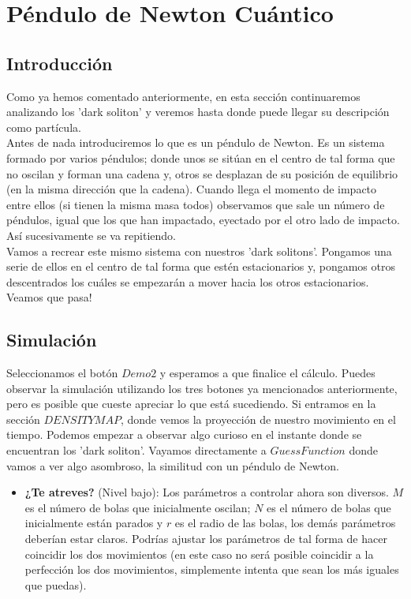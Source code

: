 \section{P\'endulo de Newton Cu\'antico}

\subsection{Introducci\'on}
Como ya hemos comentado anteriormente, en esta secci\'on continuaremos analizando los 'dark soliton' y veremos hasta donde puede llegar su descripci\'on como part\'icula. 
\\

Antes de nada introduciremos lo que es un p\'endulo de Newton. Es un sistema formado por varios p\'endulos; donde unos se sit\'uan en el centro de tal forma que no oscilan y forman una cadena y, otros se desplazan de su posici\'on de equilibrio (en la misma direcci\'on que la cadena). Cuando llega el momento de impacto entre ellos (si tienen la misma masa todos) observamos que sale un n\'umero de p\'endulos, igual que los que han impactado, eyectado por el otro lado de impacto. As\'i sucesivamente se va repitiendo. 
\\

Vamos a recrear este mismo sistema con nuestros 'dark solitons'. Pongamos una serie de ellos en el centro de tal forma que est\'en estacionarios y, pongamos otros descentrados los cu\'ales se empezar\'an a mover hacia los otros estacionarios. Veamos que pasa!

\subsection{Simulaci\'on}
Seleccionamos el bot\'on $Demo 2$ y esperamos a que finalice el c\'alculo. Puedes observar la simulaci\'on utilizando los tres botones ya mencionados anteriormente, pero es posible que cueste apreciar lo que est\'a sucediendo. Si entramos en la secci\'on $DENSITY MAP$, donde vemos la proyecci\'on de nuestro movimiento en el tiempo. Podemos empezar a observar algo curioso en el instante donde se encuentran los 'dark soliton'. Vayamos directamente a $Guess Function$ donde vamos a ver algo asombroso, la similitud con un p\'endulo de Newton.

\begin{itemize}
	\item \textbf{¿Te atreves?} (Nivel bajo): Los par\'ametros a controlar ahora son diversos. $M$ es el n\'umero de bolas que inicialmente oscilan; $N$ es el n\'umero de bolas que inicialmente est\'an parados y $r$ es el radio de las bolas, los dem\'as par\'ametros deber\'ian estar claros. Podr\'ias ajustar los par\'ametros de tal forma de hacer coincidir los dos movimientos (en este caso no ser\'a posible coincidir a la perfecci\'on los dos movimientos, simplemente intenta que sean los m\'as iguales que puedas).
\end{itemize}

